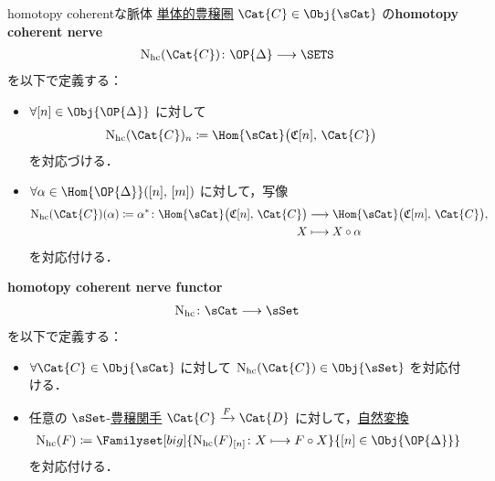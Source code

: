 \documentclass[TQFT_main]{subfiles}
\begin{document}
\begin{mydef}[label=def:nerve-hc,breakable]{homotopy coherentな脈体}
    \hyperref[def:SimpCat]{単体的豊穣圏} $\Cat{C} \in \Obj{\sCat}$ の\textbf{homotopy coherent nerve}
    \begin{align}
        \mathrm{N}_{\text{hc}}(\Cat{C}) \colon \OP{\Delta} \lto \SETS
    \end{align}
    を以下で定義する：
    \begin{itemize}
        \item $\forall [n] \in \Obj{\OP{\Delta}}$ に対して
        \begin{align}
            \mathrm{N}_{\text{hc}}(\Cat{C})_n &\coloneqq \Hom{\sCat} \bigl( \mathfrak{C}[n],\, \Cat{C} \bigr) 
        \end{align}
        を対応づける．
        \item $\forall \alpha \in \Hom{\OP{\Delta}}([n],\, [m])$ に対して，写像
        \begin{align}
            \mathrm{N}_{\text{hc}}(\Cat{C})(\alpha) \coloneqq \alpha^* \colon \Hom{\sCat} \bigl( \mathfrak{C}[n],\, \Cat{C} \bigr) &\lto \Hom{\sCat} \bigl( \mathfrak{C}[m],\, \Cat{C} \bigr), \\
            X &\lmto X \circ \alpha
        \end{align}
        を対応付ける．
    \end{itemize}
    
    \tcblower

    \textbf{homotopy coherent nerve functor}
    \begin{align}
        \mathrm{N}_{\text{hc}} \colon \sCat \lto \sSet
    \end{align}
    を以下で定義する：
    \begin{itemize}
        \item $\forall \Cat{C} \in \Obj{\sCat}$ に対して $\mathrm{N}_{\text{hc}}(\Cat{C}) \in \Obj{\sSet}$ を対応付ける．
        \item 任意の $\sSet$-\hyperref[def:enriched-functor]{豊穣関手} $\Cat{C} \xrightarrow{F} \Cat{D}$ に対して，\hyperref[def:nat]{自然変換}
        \begin{align}
            \mathrm{N}_{\text{hc}} (F) \coloneqq \Familyset[big]{\mathrm{N}_{\text{hc}}(F)_{[n]} \colon X \lmto F \circ X}{[n] \in \Obj{\OP{\Delta}}}
        \end{align}
        を対応付ける．
    \end{itemize}
\end{mydef}
\end{document}
